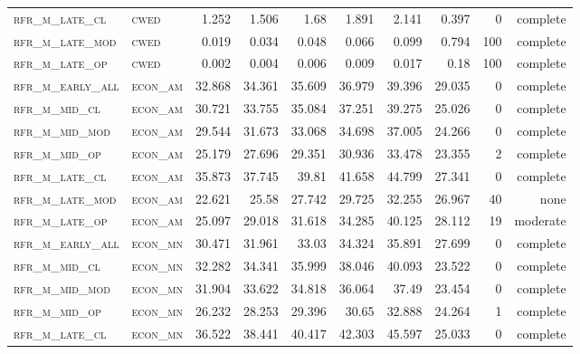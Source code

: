 \begin{landscape}
\begin{center}
\begin{footnotesize}
\begin{longtable}{llrrrrr|rrr}
\textsc{rfr\_m\_late\_cl  } & \textsc{cwed      }   & 1.252   & 1.506   & 1.68    & 1.891    & 2.141    & 0.397   & 0   & complete \\
\textsc{rfr\_m\_late\_mod } & \textsc{cwed      }   & 0.019   & 0.034   & 0.048   & 0.066    & 0.099    & 0.794   & 100 & complete \\
\textsc{rfr\_m\_late\_op  } & \textsc{cwed      }   & 0.002   & 0.004   & 0.006   & 0.009    & 0.017    & 0.18    & 100 & complete \\
\textsc{rfr\_m\_early\_all} & \textsc{econ\_am  }   & 32.868  & 34.361  & 35.609  & 36.979   & 39.396   & 29.035  & 0   & complete \\
\textsc{rfr\_m\_mid\_cl   } & \textsc{econ\_am  }   & 30.721  & 33.755  & 35.084  & 37.251   & 39.275   & 25.026  & 0   & complete \\
\textsc{rfr\_m\_mid\_mod  } & \textsc{econ\_am  }   & 29.544  & 31.673  & 33.068  & 34.698   & 37.005   & 24.266  & 0   & complete \\
\textsc{rfr\_m\_mid\_op   } & \textsc{econ\_am  }   & 25.179  & 27.696  & 29.351  & 30.936   & 33.478   & 23.355  & 2   & complete \\
\textsc{rfr\_m\_late\_cl  } & \textsc{econ\_am  }   & 35.873  & 37.745  & 39.81   & 41.658   & 44.799   & 27.341  & 0   & complete \\
\textsc{rfr\_m\_late\_mod } & \textsc{econ\_am  }   & 22.621  & 25.58   & 27.742  & 29.725   & 32.255   & 26.967  & 40  & none     \\
\textsc{rfr\_m\_late\_op  } & \textsc{econ\_am  }   & 25.097  & 29.018  & 31.618  & 34.285   & 40.125   & 28.112  & 19  & moderate \\
\textsc{rfr\_m\_early\_all} & \textsc{econ\_mn  }   & 30.471  & 31.961  & 33.03   & 34.324   & 35.891   & 27.699  & 0   & complete \\
\textsc{rfr\_m\_mid\_cl   } & \textsc{econ\_mn  }   & 32.282  & 34.341  & 35.999  & 38.046   & 40.093   & 23.522  & 0   & complete \\
\textsc{rfr\_m\_mid\_mod  } & \textsc{econ\_mn  }   & 31.904  & 33.622  & 34.818  & 36.064   & 37.49    & 23.454  & 0   & complete \\
\textsc{rfr\_m\_mid\_op   } & \textsc{econ\_mn  }   & 26.232  & 28.253  & 29.396  & 30.65    & 32.888   & 24.264  & 1   & complete \\
\textsc{rfr\_m\_late\_cl  } & \textsc{econ\_mn  }   & 36.522  & 38.441  & 40.417  & 42.303   & 45.597   & 25.033  & 0   & complete \\

\end{longtable}
\end{footnotesize}
\end{center}
\end{landscape}
